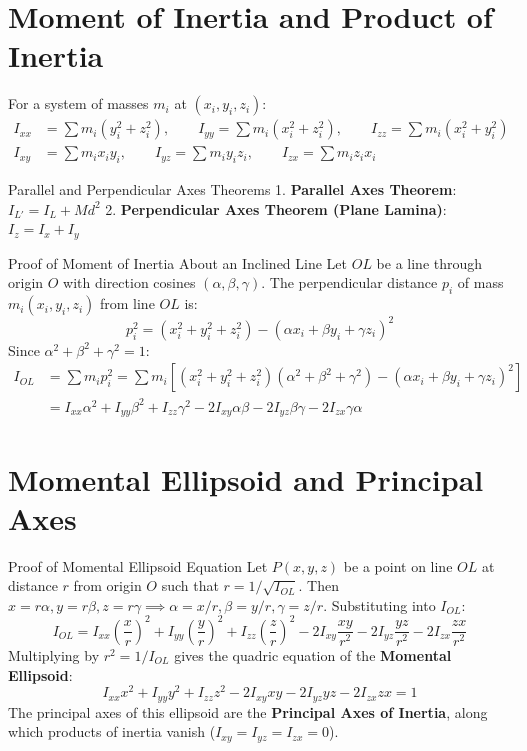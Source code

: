 \section{Moment of Inertia and Product of Inertia}

\begin{defbox}
For a system of masses $m_i$ at $(x_i, y_i, z_i)$:
\begin{align}
I_{xx} &= \sum m_i (y_i^2 + z_i^2), \qquad I_{yy} = \sum m_i (x_i^2 + z_i^2), \qquad I_{zz} = \sum m_i (x_i^2 + y_i^2) \\
I_{xy} &= \sum m_i x_i y_i, \qquad I_{yz} = \sum m_i y_i z_i, \qquad I_{zx} = \sum m_i z_i x_i
\end{align}
\end{defbox}

\begin{theorembox}{Parallel and Perpendicular Axes Theorems}
1. \textbf{Parallel Axes Theorem}: $I_{L'} = I_L + M d^2$
2. \textbf{Perpendicular Axes Theorem (Plane Lamina)}: $I_z = I_x + I_y$
\end{theorembox}

\begin{proofbox}{Proof of Moment of Inertia About an Inclined Line}
Let $OL$ be a line through origin $O$ with direction cosines $(\alpha, \beta, \gamma)$.
The perpendicular distance $p_i$ of mass $m_i(x_i, y_i, z_i)$ from line $OL$ is:
\[
p_i^2 = (x_i^2 + y_i^2 + z_i^2) - (\alpha x_i + \beta y_i + \gamma z_i)^2
\]
Since $\alpha^2 + \beta^2 + \gamma^2 = 1$:
\begin{align*}
I_{OL} &= \sum m_i p_i^2 = \sum m_i \left[ (x_i^2 + y_i^2 + z_i^2)(\alpha^2 + \beta^2 + \gamma^2) - (\alpha x_i + \beta y_i + \gamma z_i)^2 \right] \\
&= I_{xx}\alpha^2 + I_{yy}\beta^2 + I_{zz}\gamma^2 - 2I_{xy}\alpha\beta - 2I_{yz}\beta\gamma - 2I_{zx}\gamma\alpha
\end{align*}
\end{proofbox}

\section{Momental Ellipsoid and Principal Axes}

\begin{proofbox}{Proof of Momental Ellipsoid Equation}
Let $P(x, y, z)$ be a point on line $OL$ at distance $r$ from origin $O$ such that $r = 1/\sqrt{I_{OL}}$.
Then $x = r\alpha, y = r\beta, z = r\gamma \implies \alpha = x/r, \beta = y/r, \gamma = z/r$.
Substituting into $I_{OL}$:
\[
I_{OL} = I_{xx}\left(\frac{x}{r}\right)^2 + I_{yy}\left(\frac{y}{r}\right)^2 + I_{zz}\left(\frac{z}{r}\right)^2 - 2I_{xy}\frac{xy}{r^2} - 2I_{yz}\frac{yz}{r^2} - 2I_{zx}\frac{zx}{r^2}
\]
Multiplying by $r^2 = 1/I_{OL}$ gives the quadric equation of the \textbf{Momental Ellipsoid}:
\begin{equation}
I_{xx}x^2 + I_{yy}y^2 + I_{zz}z^2 - 2I_{xy}xy - 2I_{yz}yz - 2I_{zx}zx = 1
\end{equation}
The principal axes of this ellipsoid are the \textbf{Principal Axes of Inertia}, along which products of inertia vanish ($I_{xy} = I_{yz} = I_{zx} = 0$).
\end{proofbox}

